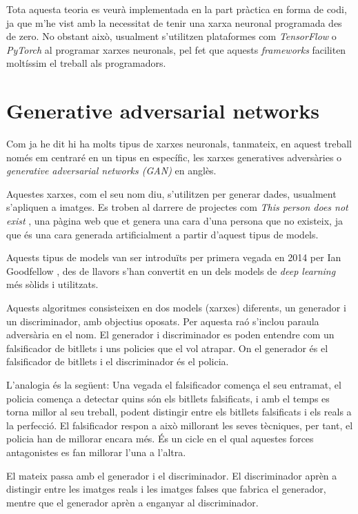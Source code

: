 Tota aquesta teoria es veurà implementada en la part pràctica en forma de codi, ja que m'he vist amb la necessitat de tenir una xarxa neuronal programada des de zero. No obstant això, usualment s'utilitzen plataformes com \textit{TensorFlow} \cite{tensorflow2015-whitepaper} o \textit{PyTorch} \cite{pytorch_2019} al programar xarxes neuronals, pel fet que aquests \textit{frameworks} faciliten moltíssim el treball als programadors.

\section{Generative adversarial networks}
Com ja he dit hi ha molts tipus de xarxes neuronals, tanmateix, en aquest treball només em centraré en un tipus en específic, les xarxes generatives adversàries o \textit{generative adversarial networks (GAN)} en anglès.

Aquestes xarxes, com el seu nom diu, s'utilitzen per generar dades, usualment s'apliquen a imatges. Es troben al darrere de projectes com \textit{This person does not exist} \cite{styleGAN, this_person_does_not_exist}, una pàgina web que et genera una cara d'una persona que no existeix, ja que és una cara generada artificialment a partir d'aquest tipus de models.

Aquests tipus de models van ser introduïts per primera vegada en 2014 per Ian Goodfellow \cite{GAN2014}, des de llavors s'han convertit en un dels models de \textit{deep learning} més sòlids i utilitzats.

Aquests algoritmes consisteixen en dos models (xarxes) diferents, un generador i un discriminador, amb objectius oposats. Per aquesta raó s'inclou paraula adversària en el nom. El generador i discriminador es poden entendre com un falsificador de bitllets i uns policies que el vol atrapar. On el generador és el falsificador de bitllets i el discriminador és el policia.

L'analogia és la següent: 
Una vegada el falsificador comença el seu entramat, el policia comença a detectar quins són els bitllets falsificats, i amb el temps es torna millor al seu treball, podent distingir entre els bitllets falsificats i els reals a la perfecció. El falsificador respon a això millorant les seves tècniques, per tant, el policia han de millorar encara més. És un cicle en el qual aquestes forces antagonistes es fan millorar l'una a l'altra.

El mateix passa amb el generador i el discriminador. El discriminador aprèn a distingir entre les imatges reals i les imatges falses que fabrica el generador, mentre que el generador aprèn a enganyar al discriminador. 

